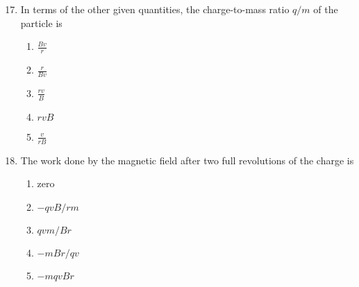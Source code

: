 \documentclass{../../oss-apphys}
\begin{document}
\begin{multicols}{2}
  \begin{enumerate}[leftmargin=18pt]
    \setcounter{enumi}{16}

  \item In terms of the other given quantities, the charge-to-mass ratio $q/m$
    of the particle is
    \begin{enumerate}[noitemsep,topsep=0pt,leftmargin=18pt,label=(\Alph*)]
    \item $\displaystyle\frac{Bv}{r}$
    \item $\displaystyle\frac{r}{Bv}$
    \item $\displaystyle\frac{rv}{B}$
    \item $rvB$
    \item $\displaystyle\frac{v}{rB}$
    \end{enumerate}
    
  \item The work done by the magnetic field after two full revolutions of the
    charge is
    \begin{enumerate}[noitemsep,topsep=0pt,leftmargin=18pt,label=(\Alph*)]
    \item zero
    \item $-qvB/rm$
    \item $qvm/Br$
    \item $-mBr/qv$
    \item $-mqvBr$
    \end{enumerate}

    \columnbreak
    


\end{enumerate}
\end{multicols}
\end{document}
